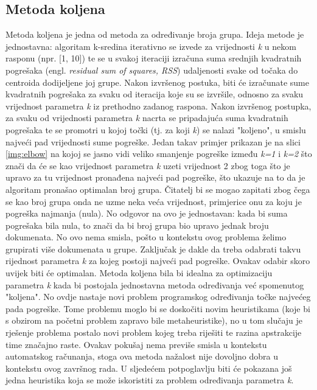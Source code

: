 \documentclass[times, utf8, zavrsni]{fer}
\begin{document}
\subsection{Metoda koljena}
Metoda koljena je jedna od metoda za određivanje broja grupa. Ideja metode je jednostavna: algoritam k-sredina iterativno se izvede za vrijednosti \textit{k} u nekom rasponu (npr. [1, 10]) te se u svakoj iteraciji izračuna suma srednjih kvadratnih pogrešaka (engl. \textit{residual sum of squares, RSS}) udaljenosti svake od točaka do centroida dodijeljene joj grupe. Nakon izvršenog postuka, biti će izračunate sume kvadratnih pogrešaka za svaku od iteracija koje su se izvršile, odnosno za svaku vrijednost parametra \textit{k} iz prethodno zadanog raspona. Nakon izvršenog postupka, za svaku od vrijednosti parametra \textit{k} nacrta se pripadajuća suma kvadratnih pogrešaka te se promotri u kojoj točki (tj. za koji \textit{k}) se nalazi "koljeno", u smislu najveći pad vrijednosti sume pogreške. Jedan takav primjer prikazan je na slici \ref{img:elbow} na kojoj se jasno vidi veliko smanjenje pogreške između \textit{k=1} i \textit{k=2} što znači da će se kao vrijednost parametra \textit{k} uzeti vrijednost 2 zbog toga što je upravo za tu vrijednost pronađena najveći pad pogreške, što ukazuje na to da je algoritam pronašao optimalan broj grupa. Čitatelj bi se mogao zapitati zbog čega se kao broj grupa onda ne uzme neka veća vrijednost, primjerice onu za koju je pogreška najmanja (nula). No odgovor na ovo je jednostavan: kada bi suma pogrešaka bila nula, to znači da bi broj grupa bio upravo jednak broju dokumenata. No ovo nema smisla, pošto u kontekstu ovog problema želimo grupirati više dokumenata u grupe. Zaključak je dakle da treba odabrati takvu rijednost parametra \textit{k} za kojeg postoji najveći pad pogreške. Ovakav odabir skoro uvijek biti će optimalan. \newline
Metoda koljena bila bi idealna za optimizaciju parametra \textit{k} kada bi postojala jednostavna metoda određivanja već spomenutog "koljena". No ovdje nastaje novi problem programskog određivanja točke najvećeg pada pogreške. Tome problemu moglo bi se doskočiti novim heuristikama (koje bi s obzirom na početni problem zapravo bile metaheuristike), no u tom slučaju je rješenje problema postalo novi problem kojeg treba riješiti te razina apstrakcije time značajno raste. Ovakav pokušaj nema previše smisla u kontekstu automatskog računanja, stoga ova metoda nažalost nije dovoljno dobra u kontekstu ovog završnog rada. U sljedećem potpoglavlju biti će pokazana još jedna heuristika koja se može iskoristiti za problem određivanja parametra \textit{k}.
\end{document}
